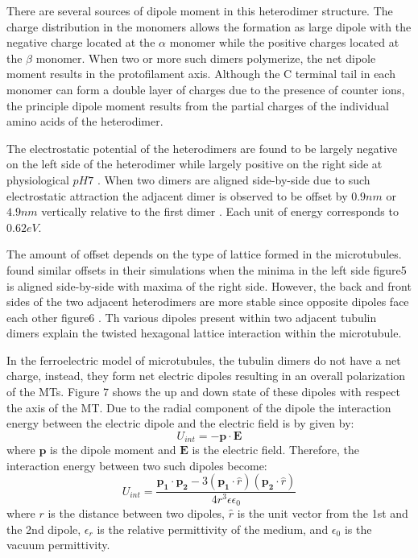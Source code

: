 \documentclass[letterpaper,final,times]{cas-dc}
\numberwithin{equation}{section}
\begin{document}
There are several sources of dipole moment in this heterodimer structure. The charge distribution in the monomers allows the formation as large dipole with the negative charge located at the $\alpha$ monomer while the positive charges located at the $\beta$ monomer. When two or more such dimers polymerize, the net dipole moment results in the protofilament axis. Although the C terminal tail in each monomer can form a double layer of charges due to the presence of counter ions, the principle dipole moment results from the partial charges of the individual amino acids of the heterodimer.

The electrostatic potential of the heterodimers are found to be largely negative on the left side of the heterodimer while largely positive on the right side at physiological $pH 7$ . When two dimers are aligned side-by-side due to such electrostatic attraction the adjacent dimer is observed to be offset by $0.9nm$ or $4.9nm$ vertically relative to the first dimer\citep{tuszynski2005} . Each unit of energy corresponds to $0.62eV$.

The amount of offset depends on the type of lattice formed in the microtubules. \citet{tuszynski2005} found similar offsets in their simulations when the minima in the left side figure5 is aligned side-by-side with maxima of the right side. However, the back and front sides of the two adjacent heterodimers are more stable since opposite dipoles face each other figure6 . Th various dipoles present within two adjacent tubulin dimers explain the twisted hexagonal lattice interaction within the microtubule.

In the ferroelectric model of microtubules, the tubulin dimers do not have a net charge, instead, they form net electric dipoles resulting in an overall polarization of the MTs.  Figure 7 shows the up and down state of these dipoles with respect the axis of the MT. Due to the radial component of the dipole the interaction energy between the electric dipole and the electric field is by given by:
\begin{equation}
    U_{int} = -\boldsymbol{p}\cdot\boldsymbol{E}
\end{equation}
where $\boldsymbol{p}$ is the dipole moment and $\boldsymbol{E}$ is the electric field. Therefore, the interaction energy between two such dipoles become:
\begin{equation}
     U_{int} = \frac{\boldsymbol{p_1}\cdot\boldsymbol{p_2}-3(\boldsymbol{p_1}\cdot\hat{r})(\boldsymbol{p_2}\cdot\hat{r})}{4r^3\epsilon\epsilon_0}
\end{equation}
where $r$ is the distance between two dipoles, $\hat{r}$ is the unit vector from the 1st and the 2nd dipole, $\epsilon_r$ is the relative permittivity of the medium, and $\epsilon_0$ is the vacuum permittivity.
\end{document}
